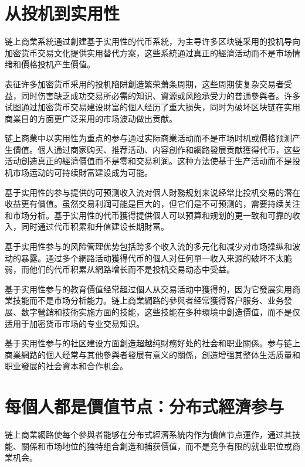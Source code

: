 \documentclass[
  Letterpaper,
]{scrbook}
\begin{document}
\section{从投机到实用性}\label{ux4eceux6295ux673aux5230ux5b9eux7528ux6027}

链上商業系統通过創建基于实用性的代币系統，为主导许多区块链采用的投机导向加密货币交易文化提供实用替代方案，这些系統通过真正的經濟活动而不是市场情绪和價格投机产生價值。

表征许多加密货币采用的投机陷阱創造繁荣萧条周期，这些周期使复杂交易者受益，同时伤害缺乏成功交易所必需的知识、資源或风险承受力的普通參與者。许多试图通过加密货币交易建设財富的個人经历了重大损失，同时为破坏区块链在实用商業目的方面更广泛采用的市场波动做出贡献。

链上商業中以实用性为重点的参与通过实际商業活动而不是市场时机或價格预测产生價值。個人通过商家购买、推荐活动、内容創作和網路發展贡献獲得代币，这些活动創造真正的經濟價值而不是零和交易利润。这种方法使基于生产活动而不是投机市场运动的可持续財富建设成为可能。

基于实用性的参与提供的可预测收入流对個人財務规划来说经常比投机交易的潜在收益更有價值。虽然交易利润可能是巨大的，但它们是不可预测的，需要持续关注和市场分析。基于实用性的代币獲得提供個人可以预算和规划的更一致和可靠的收入，同时通过代币积累和升值建设长期財富。

基于实用性参与的风险管理优势包括跨多个收入流的多元化和减少对市场操纵和波动的暴露。通过多个網路活动獲得代币的個人对任何單一收入来源的破坏不太脆弱，而他们的代币积累从網路增长而不是投机交易动态中受益。

基于实用性参与的教育價值经常超过個人从交易活动中獲得的，因为它發展实用商業技能而不是市场分析能力。链上商業網路的參與者经常獲得客户服务、业务發展、数字營銷和技術实施方面的技能，这些技能在多种環境中創造價值，而不是仅适用于加密货币市场的专业交易知识。

基于实用性参与的社区建设方面創造超越纯財務好处的社会和职业關係。参与链上商業網路的個人经常与其他參與者發展有意义的關係，創造增强其整体生活质量和职业發展的社会資本和合作机会。

\section{每個人都是價值节点：分布式經濟参与}\label{ux6bcfux500bux4ebaux90fdux662fux50f9ux503cux8282ux70b9ux5206ux5e03ux5f0fux7d93ux6fdfux53c2ux4e0e}

链上商業網路使每个參與者能够在分布式經濟系統内作为價值节点運作，通过其技能、關係和市场地位的独特组合創造和捕获價值，而不是竞争有限的就业职位或商業机会。
\end{document}

